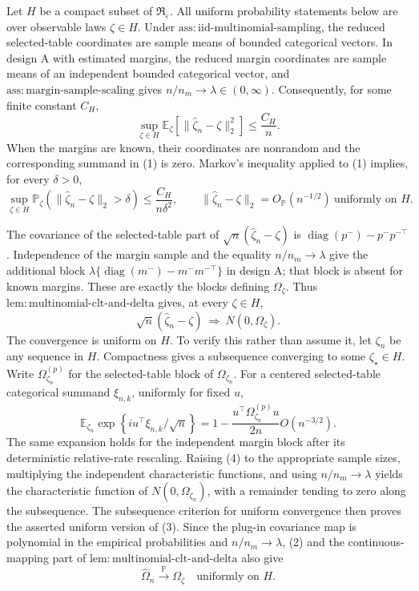Let \(H\) be a compact subset of \(\mathfrak R_{\varepsilon}\).  All uniform probability statements below are over observable laws \(\zeta\in H\).  Under \(\mathrm{ass:iid\text{-}multinomial\text{-}sampling}\), the reduced selected-table coordinates are sample means of bounded categorical vectors.  In design A with estimated margins, the reduced margin coordinates are sample means of an independent bounded categorical vector, and \(\mathrm{ass:margin\text{-}sample\text{-}scaling}\) gives \(n/n_m\to\lambda\in(0,\infty)\).  Consequently, for some finite constant \(C_H\),
\[
\sup_{\zeta\in H}
 \mathbb E_{\zeta}\!\left[\|\widehat\zeta_n-\zeta\|_2^2\right]
 \le \frac{C_H}{n}.
\tag{1}
\]
When the margins are known, their coordinates are nonrandom and the corresponding summand in (1) is zero.  Markov's inequality applied to (1) implies, for every \(\delta>0\),
\[
\sup_{\zeta\in H}
\mathbb P_{\zeta}\!\left(\|\widehat\zeta_n-\zeta\|_2>\delta\right)
\le \frac{C_H}{n\delta^2},
\qquad
\|\widehat\zeta_n-\zeta\|_2=O_{\mathbb P}(n^{-1/2})
\ \text{uniformly on }H.
\tag{2}
\]

The covariance of the selected-table part of
\(\sqrt n(\widehat\zeta_n-\zeta)\) is
\(\operatorname{diag}(p^-)-p^-p^{-\top}\).  Independence of the margin sample and the equality \(n/n_m\to\lambda\) give the additional block
\(\lambda\{\operatorname{diag}(m^-)-m^-m^{-\top}\}\) in design A; that block is absent for known margins.  These are exactly the blocks defining \(\Omega_{\zeta}\).  Thus \(\mathrm{lem:multinomial\text{-}clt\text{-}and\text{-}delta}\) gives, at every \(\zeta\in H\),
\[
\sqrt n(\widehat\zeta_n-\zeta)
\ \Rightarrow\ N(0,\Omega_{\zeta}).
\tag{3}
\]
The convergence is uniform on \(H\).  To verify this rather than assume it, let \(\zeta_n\) be any sequence in \(H\).  Compactness gives a subsequence converging to some \(\zeta_\star\in H\).  Write \(\Omega^{(p)}_{\zeta_n}\) for the selected-table block of \(\Omega_{\zeta_n}\).  For a centered selected-table categorical summand \(\xi_{n,k}\), uniformly for fixed \(u\),
\[
\mathbb E_{\zeta_n}
 \exp\!\left\{i u^\top\xi_{n,k}/\sqrt n\right\}
=1-\frac{u^\top\Omega^{(p)}_{\zeta_n}u}{2n}
O(n^{-3/2}).
\tag{4}
\]
The same expansion holds for the independent margin block after its deterministic relative-rate rescaling.  Raising (4) to the appropriate sample sizes, multiplying the independent characteristic functions, and using \(n/n_m\to\lambda\) yields the characteristic function of \(N(0,\Omega_{\zeta_n})\), with a remainder tending to zero along the subsequence.  The subsequence criterion for uniform convergence then proves the asserted uniform version of (3).  Since the plug-in covariance map is polynomial in the empirical probabilities and \(n/n_m\to\lambda\), (2) and the continuous-mapping part of \(\mathrm{lem:multinomial\text{-}clt\text{-}and\text{-}delta}\) also give
\[
\widehat\Omega_n\xrightarrow{\mathbb P}\Omega_{\zeta}
\quad\text{uniformly on }H.
\tag{5}
\]

